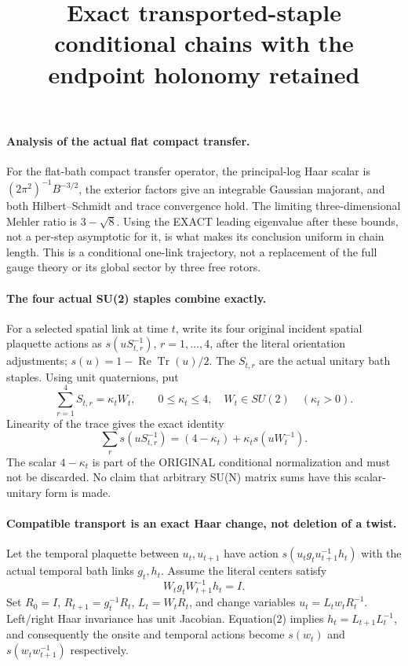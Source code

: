 \documentclass[11pt]{article}
\title{Exact transported-staple conditional chains with the endpoint holonomy retained}\author{}\date{}
\begin{document}
\maketitle
\paragraph{Analysis of the actual flat compact transfer.}
For the flat-bath compact transfer operator, the principal-log Haar scalar is
$(2\pi^2)^{-1}B^{-3/2}$, the exterior factors give an integrable Gaussian majorant,
and both Hilbert--Schmidt and trace convergence hold. The limiting three-dimensional
Mehler ratio is $3-\sqrt8$. Using the EXACT leading eigenvalue after these bounds,
not a per-step asymptotic for it, is what makes its conclusion uniform in chain
length. This is a conditional one-link trajectory, not a replacement of the
full gauge theory or its global sector by three free rotors.

\paragraph{The four actual SU(2) staples combine exactly.}
For a selected spatial link at time $t$, write its four original incident spatial
plaquette actions as $s(u S_{t,r}^{-1})$, $r=1,\ldots,4$, after the literal
orientation adjustments; $s(u)=1-\operatorname{Re}\operatorname{Tr}(u)/2$.
The $S_{t,r}$ are the actual unitary bath staples. Using unit quaternions, put
\[
 \sum_{r=1}^4 S_{t,r}=\kappa_t W_t,\qquad
 0\le\kappa_t\le4,\quad W_t\in SU(2)\quad(\kappa_t>0).
\]
Linearity of the trace gives the exact identity
\[
 \sum_r s(u S_{t,r}^{-1})=(4-\kappa_t)+\kappa_t s(uW_t^{-1}). \tag{1}
\]
The scalar $4-\kappa_t$ is part of the ORIGINAL conditional normalization and
must not be discarded. No claim that arbitrary SU(N) matrix sums have this
scalar-unitary form is made.

\paragraph{Compatible transport is an exact Haar change, not deletion of a twist.}
Let the temporal plaquette between $u_t,u_{t+1}$ have action
$s(u_t g_t u_{t+1}^{-1}h_t)$ with the actual temporal bath links $g_t,h_t$.
Assume the literal centers satisfy
\[
 W_t g_t W_{t+1}^{-1}h_t=I.                            \tag{2}
\]
Set $R_0=I$, $R_{t+1}=g_t^{-1}R_t$, $L_t=W_tR_t$, and change variables
$u_t=L_t w_tR_t^{-1}$. Left/right Haar invariance has unit Jacobian. Equation(2)
implies $h_t=L_{t+1}L_t^{-1}$, and consequently the onsite and temporal actions
become $s(w_t)$ and $s(w_tw_{t+1}^{-1})$ respectively.
\end{document}
